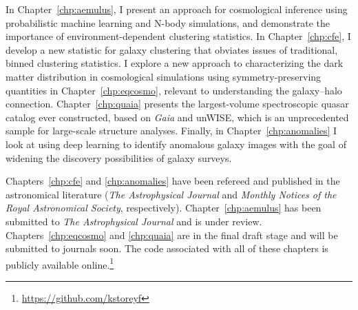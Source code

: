 In Chapter~\ref{chp:aemulus}, I present an approach for cosmological inference using probabilistic machine learning and N-body simulations, and demonstrate the importance of environment-dependent clustering statistics.
In Chapter~\ref{chp:cfe}, I develop a new statistic for galaxy clustering that obviates issues of traditional, binned clustering statistics.
I explore a new approach to characterizing the dark matter distribution in cosmological simulations using symmetry-preserving quantities in Chapter~\ref{chp:eqcosmo}, relevant to understanding the galaxy--halo connection.
Chapter~\ref{chp:quaia} presents the largest-volume spectroscopic quasar catalog ever constructed, based on \emph{Gaia} and unWISE, which is an unprecedented sample for large-scale structure analyses.
Finally, in Chapter~\ref{chp:anomalies} I look at using deep learning to identify anomalous galaxy images with the goal of widening the discovery possibilities of galaxy surveys.

Chapters~\ref{chp:cfe} and \ref{chp:anomalies} have been refereed and published in the astronomical literature (\emph{The Astrophysical Journal} and \emph{Monthly Notices of the Royal Astronomical Society}, respectively).
Chapter~\ref{chp:aemulus} has been submitted to \emph{The Astrophysical Journal} and is under review.
Chapters~\ref{chp:eqcosmo} and \ref{chp:quaia} are in the final draft stage and will be submitted to journals soon.
The code associated with all of these chapters is publicly available online.\footnote{\url{https://github.com/kstoreyf}}

